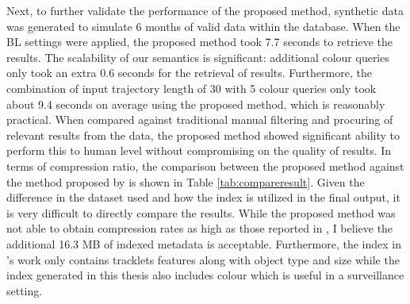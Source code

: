 Next, to further validate the performance of the proposed method, synthetic data was generated to simulate 6 months of valid data within the database. When the BL settings were applied, the proposed method took 7.7 seconds to retrieve the results. The scalability of our semantics is significant: additional colour queries only took an extra 0.6 seconds for the retrieval of results. Furthermore, the combination of input trajectory length of 30 with 5 colour queries only took about 9.4 seconds on average using the proposed method, which is reasonably practical. When compared against traditional manual filtering and procuring of relevant results from the data, the proposed method showed significant ability to perform this to human level without compromising on the quality of results. %
In terms of compression ratio, the comparison between the proposed method against the method proposed by  is shown in Table \ref{tab:compareresult}. 
Given the difference in the dataset used and how the index is utilized in the final output, it is very difficult to directly compare the results. 
While the proposed method was not able to obtain compression rates as high as those reported in , I believe the additional 16.3 MB of indexed metadata is acceptable. 
Furthermore, the index in 's work only contains tracklets features along with object type and size while the index generated in this thesis also includes colour which is useful in a surveillance setting.
